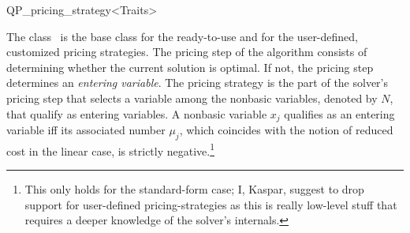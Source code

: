 
\begin{ccRefClass}{QP_pricing_strategy<Traits>}

\ccDefinition The class \ccRefName\ is the base class for the
ready-to-use and for the user-defined, customized pricing strategies.
The pricing step of the algorithm consists of determining whether the
current solution is optimal. If not, the pricing step determines an
\emph{entering variable}.  The pricing strategy is the part of the
solver's pricing step that selects a variable among the nonbasic
variables, denoted by $N$, that qualify as entering variables. A
nonbasic variable $x_{j}$ qualifies as an entering variable iff its
associated number $\mu_{j}$, which coincides with the notion of
reduced cost in the linear case, is strictly negative.\footnote{This
only holds for the standard-form case; I, Kaspar, suggest to drop
support for user-defined pricing-strategies as this is really
low-level stuff that requires a deeper knowledge of the solver's
internals.}



\end{ccRefClass}
